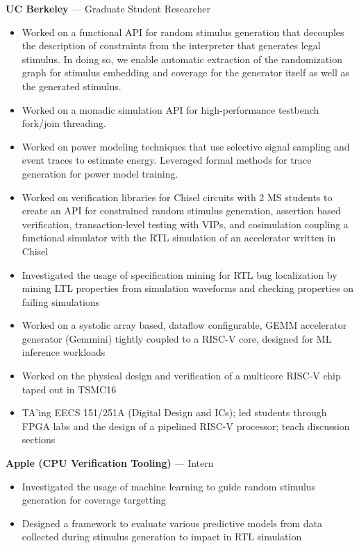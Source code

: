 \documentclass[10pt]{article}
\begin{document}
 \textbf{UC Berkeley} --- Graduate Student Researcher
\begin{itemize}
    \item Worked on a functional API for random stimulus generation that decouples the description of constraints from the interpreter that generates legal stimulus. In doing so, we enable automatic extraction of the randomization graph for stimulus embedding and coverage for the generator itself as well as the generated stimulus.
    \item Worked on a monadic simulation API for high-performance testbench fork/join threading.
    \item Worked on power modeling techniques that use selective signal sampling and event traces to estimate energy. Leveraged formal methods for trace generation for power model training.
    \item Worked on verification libraries for Chisel circuits with 2 MS students to create an API for constrained random stimulus generation, assertion based verification, transaction-level testing with VIPs, and cosimulation coupling a functional simulator with the RTL simulation of an accelerator written in Chisel
    \item Investigated the usage of specification mining for RTL bug localization by mining LTL properties from simulation waveforms and checking properties on failing simulations
    \item Worked on a systolic array based, dataflow configurable, GEMM accelerator generator (Gemmini) tightly coupled to a RISC-V core, designed for ML inference workloads
    \item Worked on the physical design and verification of a multicore RISC-V chip taped out in TSMC16
    \item TA'ing EECS 151/251A (Digital Design and ICs); led students through FPGA labs and the design of a pipelined RISC-V processor; teach discussion sections
\end{itemize}
\vspace{0.2cm}

 \textbf{Apple (CPU Verification Tooling)} --- Intern
\begin{itemize}
    \item Investigated the usage of machine learning to guide random stimulus generation for coverage targetting
    \item Designed a framework to evaluate various predictive models from data collected during stimulus generation to impact in RTL simulation
\end{itemize}
\vspace{0.2cm}
\end{document}
